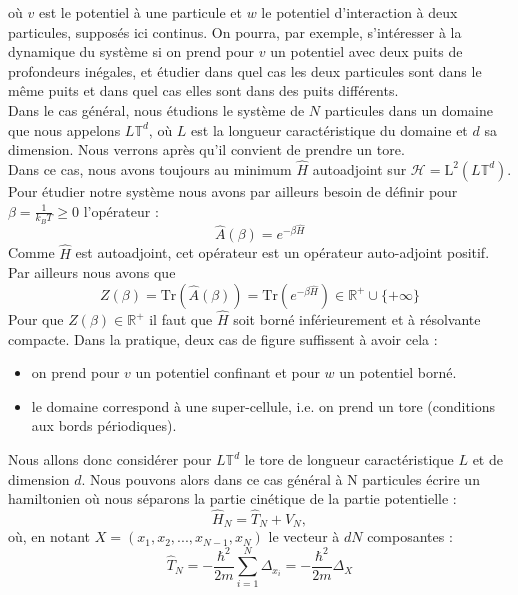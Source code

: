\documentclass[11pt]{article}
\theoremstyle{definition}
\theoremstyle{remark}
\newcommand{\hham}{\hat{H}}
\newcommand{\dom}{L\mathbb{T}^d}
\begin{document}
où $v$ est le potentiel à une particule et $w$ le potentiel d'interaction à deux particules, supposés ici continus. On pourra, par exemple, s'intéresser à la dynamique du système si on prend pour $v$ un potentiel avec deux puits de profondeurs inégales, et étudier dans quel cas les deux particules sont dans le même puits et dans quel cas elles sont dans des puits différents.
\\

Dans le cas général, nous étudions le système de $N$ particules dans un domaine que nous appelons $\dom$, où $L$ est la longueur caractéristique du domaine et $d$ sa dimension. Nous verrons après qu'il convient de prendre un tore.
\\

Dans ce cas, nous avons toujours au minimum $\hham$ autoadjoint sur $\mathcal{H}=\mathrm{L}^2(\dom)$. Pour étudier notre système nous avons par ailleurs besoin de définir pour $\beta = \frac{1}{k_BT}\geq 0$ l'opérateur :
\begin{equation}
\hat{A}(\beta)=e^{-\beta \hham}
\end{equation} 
Comme $\hham$ est autoadjoint, cet opérateur est un opérateur auto-adjoint positif. Par ailleurs nous avons que 
\begin{equation}
Z(\beta)=\mathrm{Tr}(\hat{A}(\beta))=\mathrm{Tr}(e^{-\beta \hham})\in \mathbb{R}^+\cup \lbrace+\infty\rbrace
\end{equation}
Pour que $Z(\beta)\in\mathbb{R}^+$ il faut que $\hham$ soit borné inférieurement et à résolvante compacte. Dans la pratique, deux cas de figure suffissent à avoir cela :
\begin{itemize}
\item on prend pour $v$ un potentiel confinant et pour $w$ un potentiel borné.
\item le domaine correspond à une super-cellule, i.e. on prend un tore (conditions aux bords périodiques).
\end{itemize}
Nous allons donc considérer pour $\dom$ le tore de longueur caractéristique $L$ et de dimension $d$.
Nous pouvons alors dans ce cas général à N particules écrire un hamiltonien où nous séparons la partie cinétique de la partie potentielle :
\begin{equation}
\hham_N=\hat{T}_N+\hat{V}_N ,
\end{equation}
où, en notant $X=(x_1,x_2,...,x_{N-1},x_N)$ le vecteur à $dN$ composantes : 
\begin{equation}
\hat{T}_N=-\frac{\hbar^2}{2m}\sum_{i=1}^{N}\Delta_{x_i}=-\frac{\hbar^2}{2m}\Delta_X
\end{equation}
\end{document}
